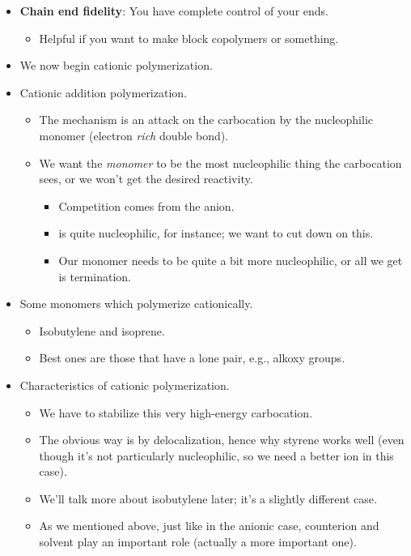 \documentclass[../notes.tex]{subfiles}
\begin{document}
\begin{itemize}
    \item \textbf{Chain end fidelity}: You have complete control of your ends.
    \begin{itemize}
        \item Helpful if you want to make block copolymers or something.
    \end{itemize}
    \item We now begin cationic polymerization.
    \item Cationic addition polymerization.
    \begin{itemize}
        \item The mechanism is an attack on the carbocation by the nucleophilic monomer (electron \emph{rich} double bond).
        \item We want the \emph{monomer} to be the most nucleophilic thing the carbocation sees, or we won't get the desired reactivity.
        \begin{itemize}
            \item Competition comes from the anion.
            \item {} is quite nucleophilic, for instance; we want to cut down on this.
            \item Our monomer needs to be quite a bit more nucleophilic, or all we get is termination.
        \end{itemize}
    \end{itemize}
    \item Some monomers which polymerize cationically.
    \begin{itemize}
        \item Isobutylene and isoprene.
        \item Best ones are those that have a lone pair, e.g., alkoxy groups.
    \end{itemize}
    \item Characteristics of cationic polymerization.
    \begin{itemize}
        \item We have to stabilize this very high-energy carbocation.
        \item The obvious way is by delocalization, hence why styrene works well (even though it's not particularly nucleophilic, so we need a better ion in this case).
        \item We'll talk more about isobutylene later; it's a slightly different case.
        \item As we mentioned above, just like in the anionic case, counterion and solvent play an important role (actually a more important one).

\end{itemize}
\end{itemize}
\end{document}
